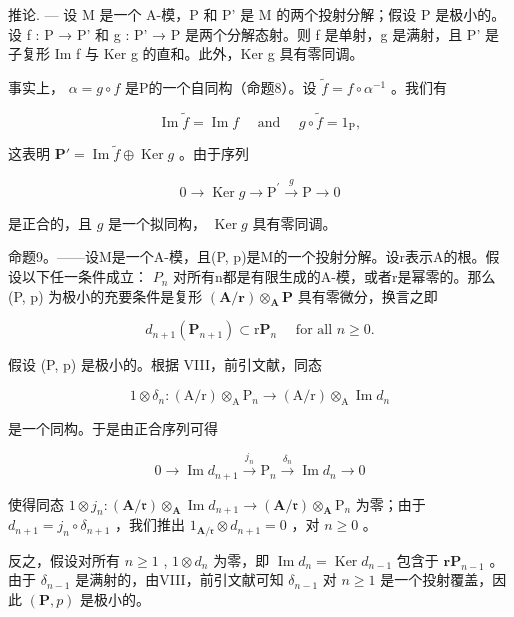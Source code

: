 推论. --- 设 M 是一个 A-模，P 和 P' 是 M 的两个投射分解；假设 P 是极小的。设 f : P → P' 和 g : P' → P 是两个分解态射。则 f 是单射，g 是满射，且 P' 是子复形 Im f 与 Ker g 的直和。此外，Ker g 具有零同调。

事实上， \(\alpha = g \circ f\) 是P的一个自同构（命题8）。设 \(\tilde{f} = f \circ \alpha^{-1}\) 。我们有

\[
\operatorname{Im} \tilde {f} = \operatorname{Im} f \quad \text { and } \quad g \circ \tilde {f} = 1 _ {\mathrm{P}},
\]

这表明 \(\mathbf{P}' = \operatorname{Im} \tilde{f} \oplus \operatorname{Ker} g\) 。由于序列

\[
0 \rightarrow \operatorname{Ker} g \rightarrow \mathrm{P} ^ {\prime} \stackrel {g} {\rightarrow} \mathrm{P} \rightarrow 0
\]

是正合的，且 \(g\) 是一个拟同构， \(\operatorname{Ker} g\) 具有零同调。

命题9。——设M是一个A-模，且(P, p)是M的一个投射分解。设r表示A的根。假设以下任一条件成立： \(P_{n}\) 对所有n都是有限生成的A-模，或者r是幂零的。那么 (P, p) 为极小的充要条件是复形 \((\mathbf{A}/\mathbf{r}) \otimes_{\mathbf{A}} \mathbf{P}\) 具有零微分，换言之即

\[
d _ {n + 1} (\mathbf {P} _ {n + 1}) \subset \mathrm{r} \mathbf {P} _ {n} \quad \text { for all } n \geqslant 0.
\]

假设 (P, p) 是极小的。根据 VIII，前引文献，同态

\[
1 \otimes \delta_ {n}: (\mathrm{A} / \mathrm{r}) \otimes_ {\mathrm{A}} \mathrm{P} _ {n} \rightarrow (\mathrm{A} / \mathrm{r}) \otimes_ {\mathrm{A}} \operatorname{Im} d _ {n}
\]

是一个同构。于是由正合序列可得

\[
0 \longrightarrow \operatorname{Im} d _ {n + 1} \xrightarrow {j _ {n}} \mathrm{P} _ {n} \xrightarrow {\delta_ {n}} \operatorname{Im} d _ {n} \longrightarrow 0
\]

使得同态 \(1 \otimes j_n : (\mathbf{A} / \mathfrak{r}) \otimes_{\mathbf{A}} \operatorname{Im} d_{n+1} \to (\mathbf{A} / \mathfrak{r}) \otimes_{\mathbf{A}} \mathrm{P}_n\) 为零；由于 \(d_{n+1} = j_n \circ \delta_{n+1}\) ，我们推出 \(1_{\mathbf{A} / \mathfrak{r}} \otimes d_{n+1} = 0\) ，对 \(n \geqslant 0\) 。

反之，假设对所有 \(n \geqslant 1\) , \(1 \otimes d_n\) 为零，即 \(\operatorname{Im} d_n = \operatorname{Ker} d_{n-1}\) 包含于 \(\mathbf{rP}_{n-1}\) 。由于 \(\delta_{n-1}\) 是满射的，由VIII，前引文献可知 \(\delta_{n-1}\) 对 \(n \geqslant 1\) 是一个投射覆盖，因此 \((\mathbf{P}, p)\) 是极小的。

